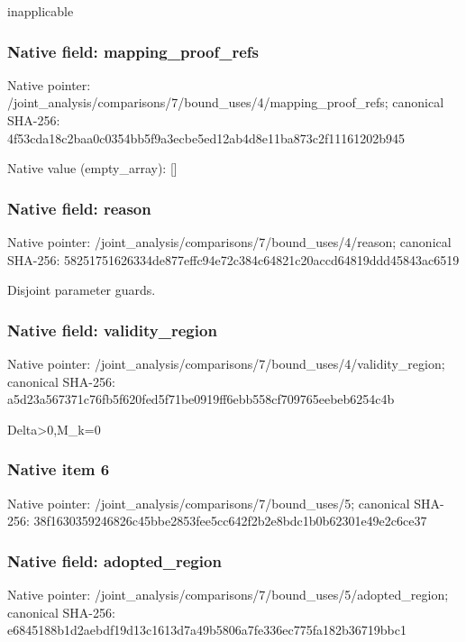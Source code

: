 \documentclass[10pt,a4paper]{article}
\begin{document}
\begingroup\raggedright\sloppy inapplicable\par\endgroup

\subsubsection{Native field: mapping\_\allowbreak{}proof\_\allowbreak{}refs}
Native pointer: /joint\_\allowbreak{}analysis/comparisons/7/bound\_\allowbreak{}uses/4/mapping\_\allowbreak{}proof\_\allowbreak{}refs; canonical SHA-256: 4f53cda18c2baa0c0354bb5f9a3ecbe5ed12ab4d8e11ba873c2f11161202b945

Native value (empty\_\allowbreak{}array): []

\subsubsection{Native field: reason}
Native pointer: /joint\_\allowbreak{}analysis/comparisons/7/bound\_\allowbreak{}uses/4/reason; canonical SHA-256: 58251751626334de877effc94e72c384c64821c20accd64819ddd45843ac6519

\begingroup\raggedright\sloppy Disjoint parameter guards.\par\endgroup

\subsubsection{Native field: validity\_\allowbreak{}region}
Native pointer: /joint\_\allowbreak{}analysis/comparisons/7/bound\_\allowbreak{}uses/4/validity\_\allowbreak{}region; canonical SHA-256: a5d23a567371c76fb5f620fed5f71be0919ff6ebb558cf709765eebeb6254c4b

\begingroup\raggedright\sloppy Delta>0,\allowbreak{}M\_\allowbreak{}k=\allowbreak{}0\par\endgroup

\subsubsection{Native item 6}
Native pointer: /joint\_\allowbreak{}analysis/comparisons/7/bound\_\allowbreak{}uses/5; canonical SHA-256: 38f1630359246826c45bbe2853fee5cc642f2b2e8bdc1b0b62301e49e2c6ce37

\subsubsection{Native field: adopted\_\allowbreak{}region}
Native pointer: /joint\_\allowbreak{}analysis/comparisons/7/bound\_\allowbreak{}uses/5/adopted\_\allowbreak{}region; canonical SHA-256: e6845188b1d2aebdf19d13c1613d7a49b5806a7fe336ec775fa182b36719bbc1
\end{document}
